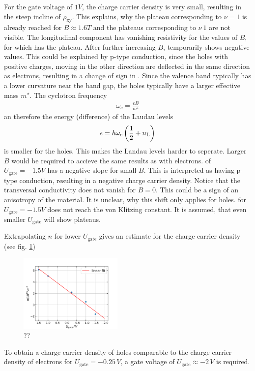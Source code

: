 For the gate voltage of $1V$, the charge carrier density is very small, resulting in the steep incline of $\rho_\text{xy}$.
This explains, why the plateau corresponding to $\nu=1$ is already reached for $B\approx1.6T$ and 
the plateaus corresponding to  $\nu\>1$ are not visible.
The longitudinal component has vanishing resistivity for the values of $B$, for which \rhall has the plateau.  
After further increasing $B$, \rhall temporarily shows negative values.
This could be explained by p-type conduction, since the holes with positive charges, 
moving in the other direction are deflected in the same direction as electrons, resulting in a change of sign in \rhall.
Since the valence band typically has a lower curvature near the band gap, the holes typically have a larger effective mass $m^\star$.
The cyclotron frequency
\begin{align}
    \omega_c = \frac{eB}{m^\star}    
\end{align}
an therefore the energy (difference) of the Laudau levels
\begin{align}
    \epsilon = \hbar \omega_c \left(\frac{1}{2} + n_\text L \right)
\end{align}
is smaller for the holes.
This makes the Landau levels harder to seperate. 
Larger $B$ would be required to accieve the same results as with electrons.
\rhall of $U_\text{gate} = -1.5V$ has a negative slope for small $B$.
This is interpreted as having p-type conduction, resulting in a negative charge carrier density.
Notice that the transversal conductivity does not vanish for $B=0$.
This could be a sign of an anisotropy of the material.
It is unclear, why this shift only applies for holes.
\rhall for $U_\text{gate} = -1.5V$ does not reach the von Klitzing constant.
It is assumed, that even smaller $U_\text{gate}$ will show plateaus. 

Extrapolating $n$ for lower $U_\text{gate}$ gives an estimate for the charge carrier density (see fig. \ref{fig:extrapolating})
\begin{figure}[h]
    \centering
    \includegraphics[width=0.45\textwidth]{../Images/extrapolatingN.png}
    \caption{??}
    \label{fig:extrapolating}
\end{figure}
To obtain a charge carrier density of holes comparable to the charge carrier density of electrons for $U_\text{gate} = -0.25\,V$,
a gate voltage of $U_\text{gate} \approx -2\,V$ is required.


